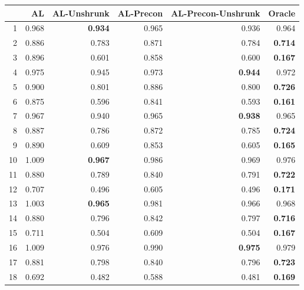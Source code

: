\documentclass[authoryear, review, 11pt]{elsarticle}
\begin{document}
\begin{table}[ht]
\centering
\begin{tabular}{rrrrrr}
  \hline
 & AL & AL-Unshrunk & AL-Precon & AL-Precon-Unshrunk & Oracle \\ 
  \hline
1 & 0.968 & \textbf{0.934} & 0.965 & 0.936 & 0.964 \\ 
  2 & 0.886 & 0.783 & 0.871 & 0.784 & \textbf{0.714} \\ 
  3 & 0.896 & 0.601 & 0.858 & 0.600 & \textbf{0.167} \\ 
  4 & 0.975 & 0.945 & 0.973 & \textbf{0.944} & 0.972 \\ 
  5 & 0.900 & 0.801 & 0.886 & 0.800 & \textbf{0.726} \\ 
  6 & 0.875 & 0.596 & 0.841 & 0.593 & \textbf{0.161} \\ 
  7 & 0.967 & 0.940 & 0.965 & \textbf{0.938} & 0.965 \\ 
  8 & 0.887 & 0.786 & 0.872 & 0.785 & \textbf{0.724} \\ 
  9 & 0.890 & 0.609 & 0.853 & 0.605 & \textbf{0.165} \\ 
  10 & 1.009 & \textbf{0.967} & 0.986 & 0.969 & 0.976 \\ 
  11 & 0.880 & 0.789 & 0.840 & 0.791 & \textbf{0.722} \\ 
  12 & 0.707 & 0.496 & 0.605 & 0.496 & \textbf{0.171} \\ 
  13 & 1.003 & \textbf{0.965} & 0.981 & 0.966 & 0.968 \\ 
  14 & 0.880 & 0.796 & 0.842 & 0.797 & \textbf{0.716} \\ 
  15 & 0.711 & 0.504 & 0.609 & 0.504 & \textbf{0.167} \\ 
  16 & 1.009 & 0.976 & 0.990 & \textbf{0.975} & 0.979 \\ 
  17 & 0.881 & 0.798 & 0.840 & 0.796 & \textbf{0.723} \\ 
  18 & 0.692 & 0.482 & 0.588 & 0.481 & \textbf{0.169} \\ 
   \hline
\end{tabular}
\end{table}
\end{document}
